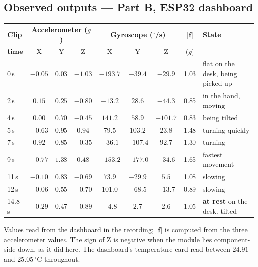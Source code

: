 \documentclass[10pt,a4paper]{article}
\begin{document}
\subsection*{Observed outputs --- Part B, ESP32 dashboard}

\vspace{2pt}
\noindent
\begin{tabularx}{\textwidth}{@{}l c c c c c c c >{\raggedright\arraybackslash}X@{}}
\toprule
\rowcolor{soft}
\textbf{Clip} & \multicolumn{3}{c}{\textbf{Accelerometer ($g$)}} & \multicolumn{3}{c}{\textbf{Gyroscope ($^{\circ}$/s)}} & $|\mathbf f|$ & \textbf{State} \\
\rowcolor{soft}
\textbf{time} & X & Y & Z & X & Y & Z & ($g$) & \\
\midrule
0\,s    & $-0.05$ & $0.03$ & $-1.03$ & $-193.7$ & $-39.4$ & $-29.9$ & 1.03 & flat on the desk, being picked up \\
2\,s    & $0.15$  & $0.25$ & $-0.80$ & $-13.2$  & $28.6$  & $-44.3$ & 0.85 & in the hand, moving \\
4\,s    & $0.00$  & $0.70$ & $-0.45$ & $141.2$  & $58.9$  & $-101.7$ & 0.83 & being tilted \\
5\,s    & $-0.63$ & $0.95$ & $0.94$  & $79.5$   & $103.2$ & $23.8$  & 1.48 & turning quickly \\
7\,s    & $0.92$  & $0.85$ & $-0.35$ & $-36.1$  & $-107.4$ & $92.7$ & 1.30 & turning \\
9\,s    & $-0.77$ & $1.38$ & $0.48$  & $-153.2$ & $-177.0$ & $-34.6$ & 1.65 & fastest movement \\
11\,s   & $-0.10$ & $0.83$ & $-0.69$ & $73.9$   & $-29.9$ & $5.5$   & 1.08 & slowing \\
12\,s   & $-0.06$ & $0.55$ & $-0.70$ & $101.0$  & $-68.5$ & $-13.7$ & 0.89 & slowing \\
14.8\,s & $-0.29$ & $0.47$ & $-0.89$ & $-4.8$   & $2.7$   & $2.6$   & 1.05 & \textbf{at rest} on the desk, tilted \\
\bottomrule
\end{tabularx}

\vspace{6pt}
\noindent Values read from the dashboard in the recording; $|\mathbf f|$ is computed
from the three accelerometer values. The sign of Z is negative when the module lies
component-side down, as it did here. The dashboard's temperature card read between
$24.91$ and $25.05\,^{\circ}\mathrm{C}$ throughout.
\end{document}
